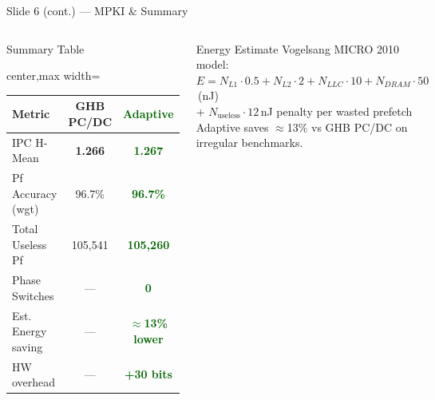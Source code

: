 \documentclass[aspectratio=169,t]{beamer}
\newcommand{\good}[1]{\textcolor{darkgreen}{\textbf{#1}}}
\newcommand{\hl}[1]{\textcolor{iitgold}{\textbf{#1}}}
\begin{document}
\begin{frame}{Slide 6 (cont.) --- MPKI \& Summary}
\begin{columns}[T,totalwidth=\textwidth]
\begin{block}{Summary Table}
\tiny
\centering
\begin{adjustbox}{center,max width=\linewidth}
\begin{tabular}{@{}lcc@{}}
\toprule
\textbf{Metric} & \textbf{GHB PC/DC} & \textbf{\good{Adaptive}}\\
\midrule
IPC H-Mean         & \hl{1.266} & \good{\textbf{1.267}}\\
Pf Accuracy (wgt)  & 96.7\%& \good{96.7\%}\\
Total Useless Pf   & 105,541& \good{105,260}\\
Phase Switches     & ---   & \good{0}\\
Est. Energy saving & ---   & \good{$\approx$13\% lower}\\
HW overhead        & ---   & \good{+30 bits}\\
\bottomrule
\end{tabular}
\end{adjustbox}
\end{block}
\begin{exampleblock}{\small Energy Estimate}
\tiny Vogelsang MICRO 2010 model:\\
$E = N_{L1}{\cdot}0.5 + N_{L2}{\cdot}2 + N_{LLC}{\cdot}10 + N_{DRAM}{\cdot}50$\,(nJ)\\
+ $N_{\text{useless}}{\cdot}12$\,nJ penalty per wasted prefetch\\
Adaptive saves $\approx$13\% vs GHB PC/DC on irregular benchmarks.
\end{exampleblock}
\end{columns}
\end{frame}

\end{document}

